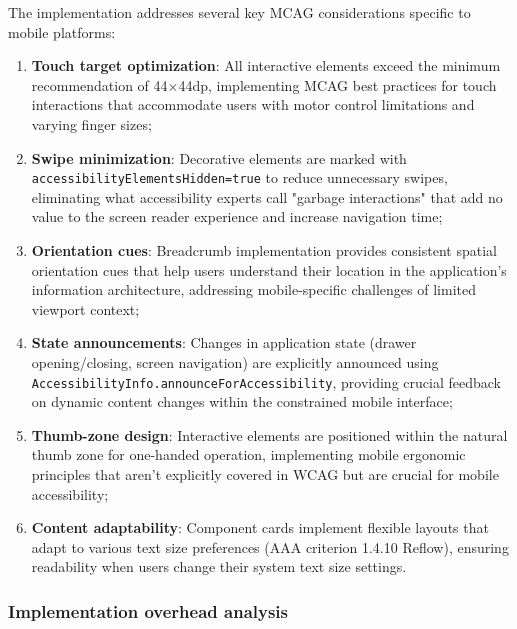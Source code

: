 \FloatBarrier

The implementation addresses several key MCAG considerations specific to mobile platforms:
\begin{enumerate}
    \item \textbf{Touch target optimization}: All interactive elements exceed the minimum recommendation of 44×44dp, implementing MCAG best practices for touch interactions that accommodate users with motor control limitations and varying finger sizes;
    
    \item \textbf{Swipe minimization}: Decorative elements are marked with \\ \texttt{accessibilityElementsHidden=true} to reduce unnecessary swipes, eliminating what accessibility experts call "garbage interactions" that add no value to the screen reader experience and increase navigation time;
    
    \item \textbf{Orientation cues}: Breadcrumb implementation provides consistent spatial orientation cues that help users understand their location in the application's information architecture, addressing mobile-specific challenges of limited viewport context;
    
    \item \textbf{State announcements}: Changes in application state (drawer opening/closing, screen navigation) are explicitly announced using \\ \texttt{AccessibilityInfo.announceForAccessibility}, providing crucial feedback on dynamic content changes within the constrained mobile interface;
    
    \item \textbf{Thumb-zone design}: Interactive elements are positioned within the natural thumb zone for one-handed operation, implementing mobile ergonomic principles that aren't explicitly covered in WCAG but are crucial for mobile accessibility;
    
    \item \textbf{Content adaptability}: Component cards implement flexible layouts that adapt to various text size preferences (AAA criterion 1.4.10 Reflow), ensuring readability when users change their system text size settings.
\end{enumerate}

\FloatBarrier

\subsubsection{Implementation overhead analysis}

